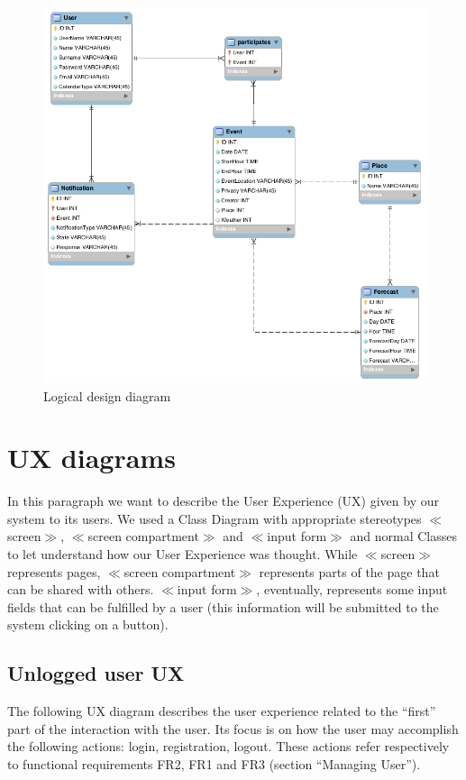 \documentclass[10pt,a4paper,titlepage]{article}
\begin{document}
\begin{figure}[p]
\centering
\includegraphics[width=\linewidth]{./images/Logic_view}
\caption[Logical design view]{Logical design diagram}
\label{fig:Logic_view}
\end{figure}

\clearpage
\section{UX diagrams}
\label{sec:UXdiagrams}
In this paragraph we want to describe the User Experience (UX) given by our system to its users. We used a Class Diagram with appropriate stereotypes $\ll$screen$\gg$, $\ll$screen compartment$\gg$ and $\ll$input form$\gg$ and normal Classes to let understand how our User Experience was thought. While $\ll$screen$\gg$ represents pages, $\ll$screen compartment$\gg$ represents parts of the page that can be shared with others. $\ll$input form$\gg$, eventually, represents some input fields that can be fulfilled by a user (this information will be submitted to the system clicking on a button).

\subsection{Unlogged user UX}
The following UX diagram describes the user experience related to the “first” part of the interaction with the user. Its focus is on how the user may accomplish the following actions: login, registration, logout. These actions refer respectively to functional requirements FR2, FR1 and FR3 (section “Managing User”).
\end{document}
